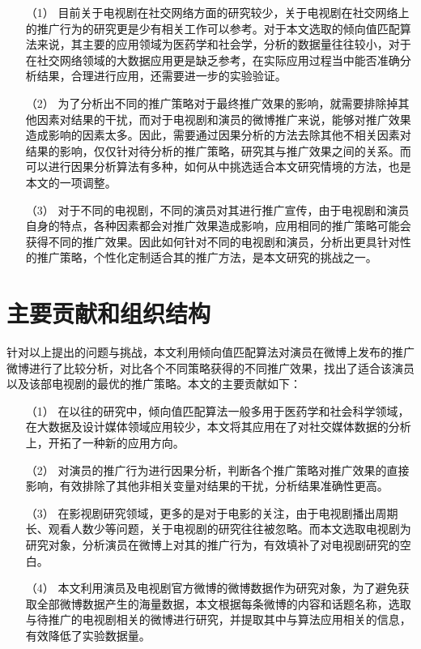 \begin{itemize}

\item[（1）]目前关于电视剧在社交网络方面的研究较少，关于电视剧在社交网络上的推广行为的研究更是少有相关工作可以参考。对于本文选取的倾向值匹配算法来说，其主要的应用领域为医药学和社会学，分析的数据量往往较小，对于在社交网络领域的大数据应用更是缺乏参考，在实际应用过程当中能否准确分析结果，合理进行应用，还需要进一步的实验验证。

\item[（2）]为了分析出不同的推广策略对于最终推广效果的影响，就需要排除掉其他因素对结果的干扰，而对于电视剧和演员的微博推广来说，能够对推广效果造成影响的因素太多。因此，需要通过因果分析的方法去除其他不相关因素对结果的影响，仅仅针对待分析的推广策略，研究其与推广效果之间的关系。而可以进行因果分析算法有多种，如何从中挑选适合本文研究情境的方法，也是本文的一项调整。

\item[（3）]对于不同的电视剧，不同的演员对其进行推广宣传，由于电视剧和演员自身的特点，各种因素都会对推广效果造成影响，应用相同的推广策略可能会获得不同的推广效果。因此如何针对不同的电视剧和演员，分析出更具针对性的推广策略，个性化定制适合其的推广方法，是本文研究的挑战之一。


\end{itemize}

\section{主要贡献和组织结构}

针对以上提出的问题与挑战，本文利用倾向值匹配算法对演员在微博上发布的推广微博进行了比较分析，对比各个不同策略获得的不同推广效果，找出了适合该演员以及该部电视剧的最优的推广策略。本文的主要贡献如下：

\begin{itemize}

\item[（1）]在以往的研究中，倾向值匹配算法一般多用于医药学和社会科学领域，在大数据及设计媒体领域应用较少，本文将其应用在了对社交媒体数据的分析上，开拓了一种新的应用方向。

\item[（2）]对演员的推广行为进行因果分析，判断各个推广策略对推广效果的直接影响，有效排除了其他非相关变量对结果的干扰，分析结果准确性更高。

\item[（3）]在影视剧研究领域，更多的是对于电影的关注，由于电视剧播出周期长、观看人数少等问题，关于电视剧的研究往往被忽略。而本文选取电视剧为研究对象，分析演员在微博上对其的推广行为，有效填补了对电视剧研究的空白。

\item[（4）]本文利用演员及电视剧官方微博的微博数据作为研究对象，为了避免获取全部微博数据产生的海量数据，本文根据每条微博的内容和话题名称，选取与待推广的电视剧相关的微博进行研究，并提取其中与算法应用相关的信息，有效降低了实验数据量。

\end{itemize}


